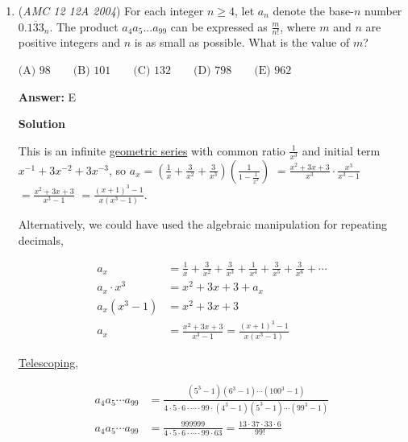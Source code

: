 \begin{enumerate}
 
 \begin{align*} A &= 2(\mathrm{Blue\ Sector}) + 2(\mathrm{Red\ Sector}) - 2(\mathrm{Equilateral\ Triangle}) \\ A &= 2\left(\frac{120^\circ}{360^\circ} \cdot \pi (2)^2\right) + 2\left(\frac{60^\circ}{360^\circ} \cdot \pi (1)^2\right) - 2\left(\frac{(1)^2\sqrt{3}}{4}\right) \\ A &= \frac{8\pi}{3} + \frac{\pi}{3} - \frac{\sqrt{3}}{2} \\ A &= 3\pi - \frac{\sqrt{3}}{2} \Longrightarrow \textbf {(C)}\end{align*}




	\item (\textit{AMC 12 12A 2004}) For each integer $n\geq 4$, let $a_n$ denote the base-$n$ number $0.\overline{133}_n$. The product $a_4a_5...a_{99}$ can be expressed as $\frac {m}{n!}$, where $m$ and $n$ are positive integers and $n$ is as small as possible. What is the value of $m$?


 $\text {(A) } 98 \qquad \text {(B) } 101 \qquad \text {(C) } 132\qquad \text {(D) } 798\qquad \text {(E) }962$

 \textbf{Answer: }E



\textbf{Solution}

This is an infinite \href{https://artofproblemsolving.com/wiki/index.php?title=Geometric\_series}{geometric series} with common ratio $\frac{1}{x^3}$ and initial term $x^{-1} + 3x^{-2} + 3x^{-3}$, so $a_x = \left(\frac{1}{x} + \frac{3}{x^2} + \frac{3}{x^3}\right)\left(\frac{1}{1-\frac{1}{x^3}}\right)$ $= \frac{x^2 + 3x + 3}{x^3} \cdot \frac{x^3}{x^3 - 1}$ $= \frac{x^2 + 3x + 3}{x^3 - 1}$ $= \frac{(x+1)^3 - 1}{x(x^3 - 1)}$.

 Alternatively, we could have used the algebraic manipulation for repeating decimals, 

 
 \begin{align*} a_x &= \frac{1}{x}+\frac{3}{x^2}+\frac{3}{x^3}+\frac{1}{x^4}+\frac{3}{x^5}+\frac{3}{x^6}+\cdots \\ a_x \cdot x^3 &= x^2+3x+3+a_x\\ a_x(x^3-1) &= x^2+3x+3\\ a_x &= \frac{x^2+3x+3}{x^3-1}=\frac{(x+1)^3-1}{x(x^3-1)} \end{align*}


 \href{https://artofproblemsolving.com/wiki/index.php?title=Telescoping}{Telescoping}, 

 
 \begin{align*} a_4a_5\cdots a_{99}&= \frac{(5^3-1)(6^3-1)\cdots (100^3-1)}{4 \cdot 5 \cdot 6 \cdot \cdots \cdot 99 \cdot (4^3-1)(5^3-1)\cdots(99^3-1)}\\ a_4a_5\cdots a_{99}&= \frac{999999}{4 \cdot 5 \cdot 6 \cdot \cdots \cdot 99 \cdot 63}=\frac{13 \cdot 37 \cdot 33 \cdot 6}{99!}\end{align*}



\end{enumerate}

